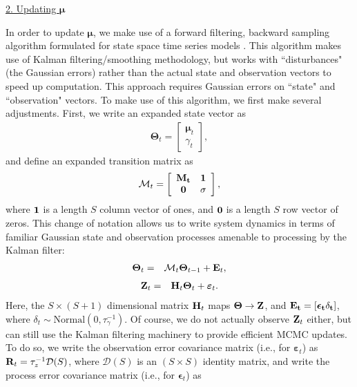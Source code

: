 \documentclass[12pt,fleqn]{article}
\begin{document}
\begin{flushleft}
\underline{2. Updating $\boldsymbol{\mu}$}

In order to update $\boldsymbol{\mu}$, we make use of a forward filtering, backward sampling algorithm formulated for state space time series models \citep{DurbinKoopman2002}.  This algorithm
makes use of Kalman filtering/smoothing methodology, but works with ``disturbances" (the Gaussian errors) rather than the actual state and observation vectors to speed up computation.  This approach requires Gaussian errors on ``state" and ``observation" vectors.  To make use of this algorithm, we first make several adjustments.  First, we write an expanded state vector as
\begin{eqnarray*}
  \boldsymbol{\Theta}_t = \left[  \begin{array}{c} \boldsymbol{\mu}_t \\ \gamma_t \end{array} \right],
\end{eqnarray*}
and define an expanded transition matrix as
\begin{eqnarray*}
  \mathcal{M}_t = \left[  \begin{array}{cc} \bf{M}_t & {\bf 1} \\ {\bf 0} & \sigma \end{array} \right],
\end{eqnarray*}
where ${\bf 1}$ is a length $S$ column vector of ones, and ${\bf 0}$ is a length $S$ row vector of zeros.  This change of notation allows us to write system dynamics in terms of familiar Gaussian state and observation processes amenable to processing by the Kalman filter:
\begin{eqnarray}
  \boldsymbol{\Theta}_t & = & \mathcal{M}_t \boldsymbol{\Theta}_{t-1} + {\bf E}_t,
  \label{eq:state-eq}
\end{eqnarray}
\begin{eqnarray}
  {\bf Z}_t & = & {\bf H}_t \boldsymbol{\Theta}_t + \boldsymbol{\varepsilon}_t.
   \label{eq:obs-eq}
\end{eqnarray}
Here, the $S \times (S+1)$ dimensional matrix ${\bf H}_t$ maps $\boldsymbol{\Theta} \rightarrow {\bf Z}$, and $\bf{E}_t = [\boldsymbol{\epsilon}_t \delta_t]$,
where $\delta_t \sim \textrm{Normal}(0,\tau_\gamma^{-1})$.
Of course, we do not actually observe ${\bf Z}_t$ either, but can still use the Kalman filtering machinery to provide efficient MCMC updates.  To do so, we write the observation error covariance matrix (i.e., for $\boldsymbol{\varepsilon}_t$) as ${\bf R}_t = \tau_z^{-1} \mathcal{D}(S)$, where $\mathcal{D}(S)$ is an $(S \times S)$ identity matrix, and write the process error covariance matrix (i.e., for $\boldsymbol{\epsilon}_t$) as

\end{flushleft}
\end{document}
